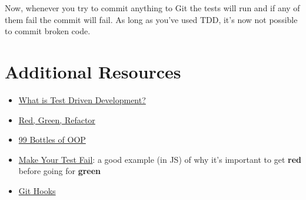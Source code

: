 Now, whenever you try to commit anything to Git the tests will run and if any of them fail the commit will fail. As long as you've used TDD, it's now not possible to commit broken code.


\section{Additional Resources}

\begin{itemize}[leftmargin=*]
    \item \href{https://www.freecodecamp.org/news/test-driven-development-what-it-is-and-what-it-is-not-41fa6bca02a2/}{What is Test Driven Development?}
    \item \href{https://www.codecademy.com/articles/tdd-red-green-refactor}{Red, Green, Refactor}
    \item \href{https://www.sandimetz.com/99bottles}{99 Bottles of OOP}
    \item \href{https://kentcdodds.com/blog/make-your-test-fail}{Make Your Test Fail}: a good example (in JS) of why it's important to get \textbf{red} before going for \textbf{green}
    \item \href{https://git-scm.com/book/en/v2/Customizing-Git-Git-Hooks}{Git Hooks}
\end{itemize}

